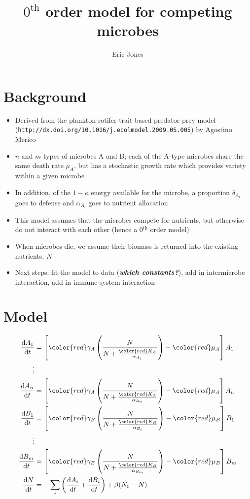 \documentclass[]{article}
\title{\(0^{\text {th}}\) order model for competing microbes}
\author{Eric Jones}
\date{}
\newcommand*\diff{\mathop{}\!\mathrm{d}}
\newcommand*\red{\color{red}}
\begin{document}
\maketitle

\section{Background}\label{background}

\begin{itemize}
\itemsep1pt\parskip0pt
\item
  Derived from the plankton-rotifer trait-based predator-prey model
  (\texttt{http://dx.doi.org/10.1016/j.ecolmodel.2009.05.005}) by
  Agostino Merico
\item
  \(n\) and \(m\) types of microbes A and B; each of the A-type microbes
  share the same death rate \(\mu_A\), but has a stochastic growth rate
  which provides variety within a given microbe
\item
  In addition, of the \(1 - \kappa\) energy available for the microbe, a
  proportion \(\delta_{A_i}\) goes to defense and \(\alpha_{A_i}\) goes
  to nutrient allocation
\item
  This model assumes that the microbes compete for nutrients, but
  otherwise do not interact with each other (hence a 0\(^\text{th}\)
  order model)
\item
  When microbes die, we assume their biomass is returned into the
  existing nutrients, \(N\)
\item
  Next steps: fit the model to data (\textbf{\emph{which constants?}}),
  add in intermicrobe interaction, add in immune system interaction
\end{itemize}

\section{Model}\label{model}

\begin{align*}
    \frac{\diff A_1}{\diff t} &= \left[ {\red \gamma_A} \left(
    \frac{N}{N + \frac{\color{red} K_{A}}{\alpha_{A_1}}}\right) - {\red \mu_A}
    \right]A_1\\ \vdots & \\
    \frac{\diff A_n}{\diff t} &= \left[ {\red \gamma_A} \left( \frac{N}{N +
    \frac{\color{red} K_{A}}{\alpha_{A_n}}}\right) - {\red \mu_A} \right]A_n\\
    \frac{\diff B_1}{\diff t} &= \left[ {\red \gamma_B} \left(
    \frac{N}{N + \frac{\color{red} K_{B}}{\alpha_{B_i}}}\right) - {\red \mu_B}
    \right]B_1\\ \vdots & \\
    \frac{\diff B_m}{\diff t} &= \left[ {\red \gamma_B} \left(
    \frac{N}{N + \frac{\color{red} K_{B}}{\alpha_{B_m}}}\right) - {\red \mu_B}
    \right]B_m\\ \frac{\diff N}{\diff t} &= - \sum_i \left( \frac{\diff
    A_i}{\diff t} + \frac{\diff B_i}{\diff t}  \right) + \beta(N_0 - N)
\end{align*}
\end{document}
